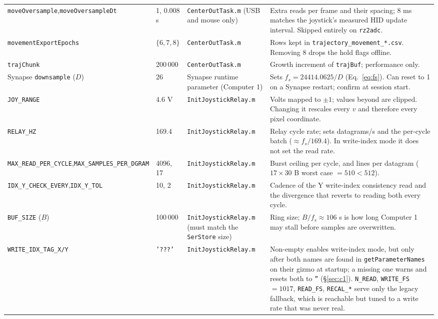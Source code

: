 \documentclass[11pt,a4paper]{article}
\newcommand{\code}[1]{\texttt{\small #1}}
\newcommand{\file}[1]{\texttt{\small #1}}
\begin{document}
\begin{longtable}{@{}P{4.0cm}P{1.65cm}P{3.55cm}P{5.75cm}@{}}
\code{moveOversample},\newline\code{moveOversampleDt} & 1, 0.008 s &
  \file{CenterOutTask.m} (USB and mouse only) &
  Extra reads per frame and their spacing; 8 ms matches the joystick's measured
  HID update interval. Skipped entirely on \code{rz2adc}. \\
\code{movementExportEpochs} & $\{6,7,8\}$ & \file{CenterOutTask.m} &
  Rows kept in \code{trajectory\_movement\_*.csv}. Removing 8 drops the hold
  flags offline. \\
\code{trajChunk} & 200\,000 & \file{CenterOutTask.m} &
  Growth increment of \code{trajBuf}; performance only. \\
\midrule
Synapse \code{downsample} ($D$) & 26 & Synapse runtime parameter (Computer 1) &
  Sets $f_s = 24414.0625/D$ (Eq.~\eqref{eq:fs}). Can reset to 1 on a Synapse
  restart; confirm at session start. \\
\code{JOY\_RANGE} & 4.6 V & \file{InitJoystickRelay.m} &
  Volts mapped to $\pm 1$; values beyond are clipped. Changing it rescales
  every $v$ and therefore every pixel coordinate. \\
\code{RELAY\_HZ} & 169.4 & \file{InitJoystickRelay.m} &
  Relay cycle rate; sets datagrams/s and the per-cycle batch
  ($\approx f_s/169.4$). In write-index mode it does not set the read rate. \\
\code{MAX\_READ\_PER\_CYCLE},\newline\code{MAX\_SAMPLES\_PER\_DGRAM} & 4096, 17 &
  \file{InitJoystickRelay.m} &
  Burst ceiling per cycle, and lines per datagram ($17 \times 30$ B worst case
  $= 510 < 512$). \\
\code{IDX\_Y\_CHECK\_EVERY},\newline\code{IDX\_Y\_TOL} & 10, 2 &
  \file{InitJoystickRelay.m} &
  Cadence of the Y write-index consistency read and the divergence that reverts
  to reading both every cycle. \\
\code{BUF\_SIZE} ($B$) & 100\,000 & \file{InitJoystickRelay.m} (must match the
  \code{SerStore} size) &
  Ring size; $B/f_s \approx 106$ s is how long Computer 1 may stall before
  samples are overwritten. \\
\code{WRITE\_IDX\_TAG\_X/Y} & \code{'???'} & \file{InitJoystickRelay.m} &
  Non-empty enables write-index mode, but only after both names are found in
  \code{getParameterNames} on their gizmo at startup; a missing one warns and
  resets both to \code{''} (\S\ref{sec:c1}). \code{N\_READ},
  \code{WRITE\_FS} $=1017$, \code{READ\_FS}, \code{RECAL\_*} serve only the
  legacy fallback, which is reachable but tuned to a write rate that was never
  real. \\
\bottomrule
\end{longtable}
\end{document}
